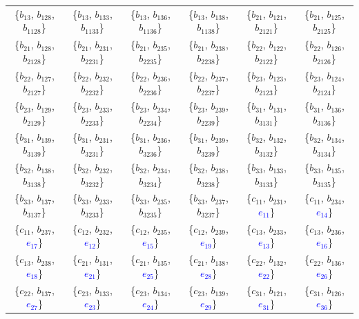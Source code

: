 \documentclass[%
  reprint,
  superscriptaddress,
  showkeys,
  amsmath,amssymb,
  aps,pra,
  longbibliography,
  floatfix,
  x11names
]{revtex4-2}
\DeclareRobustCommand{\chg}[1]{\textcolor{blue}{#1}}
\begin{document}
\begin{table}[htbp!]
\begin{ruledtabular}
\begin{tabular}{*{6}{c}}
\{$b_{13}$, $b_{128}$, $b_{1128}$\} & \{$b_{13}$, $b_{133}$, $b_{1133}$\} & \{$b_{13}$, $b_{136}$, $b_{1136}$\} & \{$b_{13}$, $b_{138}$, $b_{1138}$\} & \{$b_{21}$, $b_{121}$, $b_{2121}$\} & \{$b_{21}$, $b_{125}$, $b_{2125}$\} \\
\{$b_{21}$, $b_{128}$, $b_{2128}$\} & \{$b_{21}$, $b_{231}$, $b_{2231}$\} & \{$b_{21}$, $b_{235}$, $b_{2235}$\} & \{$b_{21}$, $b_{238}$, $b_{2238}$\} & \{$b_{22}$, $b_{122}$, $b_{2122}$\} & \{$b_{22}$, $b_{126}$, $b_{2126}$\} \\
\{$b_{22}$, $b_{127}$, $b_{2127}$\} & \{$b_{22}$, $b_{232}$, $b_{2232}$\} & \{$b_{22}$, $b_{236}$, $b_{2236}$\} & \{$b_{22}$, $b_{237}$, $b_{2237}$\} & \{$b_{23}$, $b_{123}$, $b_{2123}$\} & \{$b_{23}$, $b_{124}$, $b_{2124}$\} \\
\{$b_{23}$, $b_{129}$, $b_{2129}$\} & \{$b_{23}$, $b_{233}$, $b_{2233}$\} & \{$b_{23}$, $b_{234}$, $b_{2234}$\} & \{$b_{23}$, $b_{239}$, $b_{2239}$\} & \{$b_{31}$, $b_{131}$, $b_{3131}$\} & \{$b_{31}$, $b_{136}$, $b_{3136}$\} \\
\{$b_{31}$, $b_{139}$, $b_{3139}$\} & \{$b_{31}$, $b_{231}$, $b_{3231}$\} & \{$b_{31}$, $b_{236}$, $b_{3236}$\} & \{$b_{31}$, $b_{239}$, $b_{3239}$\} & \{$b_{32}$, $b_{132}$, $b_{3132}$\} & \{$b_{32}$, $b_{134}$, $b_{3134}$\} \\
\{$b_{32}$, $b_{138}$, $b_{3138}$\} & \{$b_{32}$, $b_{232}$, $b_{3232}$\} & \{$b_{32}$, $b_{234}$, $b_{3234}$\} & \{$b_{32}$, $b_{238}$, $b_{3238}$\} & \{$b_{33}$, $b_{133}$, $b_{3133}$\} & \{$b_{33}$, $b_{135}$, $b_{3135}$\} \\
\{$b_{33}$, $b_{137}$, $b_{3137}$\} & \{$b_{33}$, $b_{233}$, $b_{3233}$\} & \{$b_{33}$, $b_{235}$, $b_{3235}$\} & \{$b_{33}$, $b_{237}$, $b_{3237}$\} & \{$c_{11}$, $b_{231}$, \chg{$e_{11}$}\} & \{$c_{11}$, $b_{234}$, \chg{$e_{14}$}\} \\
\{$c_{11}$, $b_{237}$, \chg{$e_{17}$}\} & \{$c_{12}$, $b_{232}$, \chg{$e_{12}$}\} & \{$c_{12}$, $b_{235}$, \chg{$e_{15}$}\} & \{$c_{12}$, $b_{239}$, \chg{$e_{19}$}\} & \{$c_{13}$, $b_{233}$, \chg{$e_{13}$}\} & \{$c_{13}$, $b_{236}$, \chg{$e_{16}$}\} \\
\{$c_{13}$, $b_{238}$, \chg{$e_{18}$}\} & \{$c_{21}$, $b_{131}$, \chg{$e_{21}$}\} & \{$c_{21}$, $b_{135}$, \chg{$e_{25}$}\} & \{$c_{21}$, $b_{138}$, \chg{$e_{28}$}\} & \{$c_{22}$, $b_{132}$, \chg{$e_{22}$}\} & \{$c_{22}$, $b_{136}$, \chg{$e_{26}$}\} \\
\{$c_{22}$, $b_{137}$, \chg{$e_{27}$}\} & \{$c_{23}$, $b_{133}$, \chg{$e_{23}$}\} & \{$c_{23}$, $b_{134}$, \chg{$e_{24}$}\} & \{$c_{23}$, $b_{139}$, \chg{$e_{29}$}\} & \{$c_{31}$, $b_{121}$, \chg{$e_{31}$}\} & \{$c_{31}$, $b_{126}$, \chg{$e_{36}$}\} \\

\end{tabular}
\end{ruledtabular}
\end{table}
\end{document}

